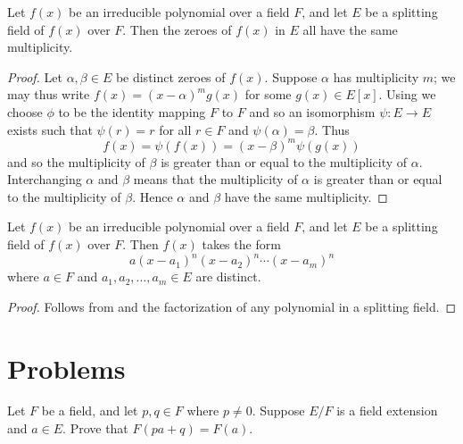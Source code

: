 \begin{theorem}\label{thrm-zeroes-of-irreducible-over-splitting-field-have-same-multiplicity}
    Let $f(x)$ be an irreducible polynomial over a field $F$, and let $E$ be a splitting field of $f(x)$ over $F$. Then the zeroes of $f(x)$ in $E$ all have the same multiplicity.
\end{theorem}
\begin{proof}
    Let $\alpha, \beta \in E$ be distinct zeroes of $f(x)$. Suppose $\alpha$ has multiplicity $m$; we may thus write $f(x) = (x-\alpha)^mg(x)$ for some $g(x) \in E[x]$. Using  we choose $\phi$ to be the identity mapping $F$ to $F$ and so an isomorphism $\psi: E \to E$ exists such that $\psi(r) = r$ for all $r \in F$ and $\psi(\alpha) = \beta$. Thus
    \[
        f(x) = \psi(f(x)) = (x-\beta)^m\psi(g(x))
    \]
    and so the multiplicity of $\beta$ is greater than or equal to the multiplicity of $\alpha$. Interchanging $\alpha$ and $\beta$ means that the multiplicity of $\alpha$ is greater than or equal to the multiplicity of $\beta$. Hence $\alpha$ and $\beta$ have the same multiplicity.
\end{proof}

\begin{corollary}\label{corollary-factorization-of-irreducible-polynomial-over-splitting-field}
    Let $f(x)$ be an irreducible polynomial over a field $F$, and let $E$ be a splitting field of $f(x)$ over $F$. Then $f(x)$ takes the form
    \[
        a(x-a_1)^n(x-a_2)^n\cdots(x-a_m)^n
    \]
    where $a \in F$ and $a_1, a_2, \dots, a_m \in E$ are distinct.
\end{corollary}
\begin{proof}
    Follows from  and the factorization of any polynomial in a splitting field.
\end{proof}

\newpage

\section{Problems}
\begin{problem}\label{problem-simple-extension-absorbs-field-elements}
    Let $F$ be a field, and let $p, q \in F$ where $p \neq 0$. Suppose $E/F$ is a field extension and $a \in E$. Prove that $F(pa + q) = F(a)$.
\end{problem}

